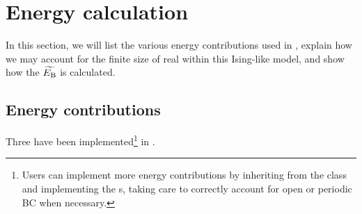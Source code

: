 \newpage
\section{Energy calculation}\label{sec:2:Energy}
In this section, we will list the various energy contributions used in \hotspice, explain how we may account for the finite size of real  within this Ising-like model, and show how the  $\widetilde{E_\mathrm{B}}$ is calculated.

\subsection{Energy contributions}
Three  have been implemented\footnote{
	Users can implement more energy contributions by inheriting from the  class and implementing the s, taking care to correctly account for open or periodic BC when necessary.
} in \hotspice.
